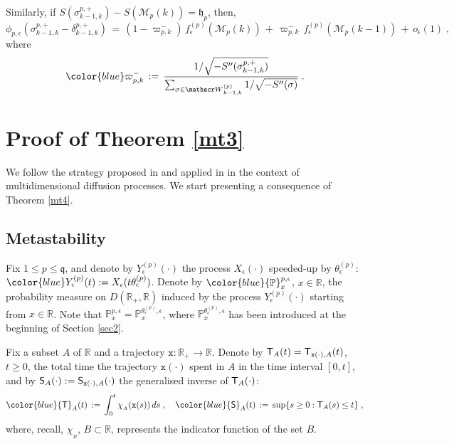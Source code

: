 \documentclass[reqno]{amsart}
\theoremstyle{plain}
\theoremstyle{definition}
\newcommand{\mf}[1]{{\mathfrak #1}}
\newcommand{\bb}[1]{{\mathbb #1}}
\newcommand{\ms}[1]{{\mathscr #1}}
\newcommand{\mss}[1]{{\textsf #1}}
\newcommand{\mtt}[1]{{\mathtt #1}}
\newcounter{as}[section]
\newcommand{\<}{\langle}
\renewcommand{\>}{\rangle}
\begin{document}
Similarly, if $S(\sigma^{p,+}_{k-1,k}) - S(\ms M_p(k)) = \mf
h_p$, then,
\begin{equation}
\label{67}
\phi_{p,\epsilon}(\sigma^{p,+}_{k-1,k} - \delta^{p,+}_{k-1,k}) \,=\,
(1-\varpi^{-}_{p,k})\, f^{(p)}_\epsilon(\ms M_p(k)) 
\,+\, \varpi^{-}_{p,k} \,  f^{(p)}_\epsilon(\ms M_p(k-1)) 
\,+\,o_\epsilon(1)\;,
\end{equation}
where
\begin{equation*}
{\color{blue} \varpi^{-}_{p,k} } \,: =\,
\frac{1/\sqrt{- S''(\sigma^{p,+}_{k-1,k})}}
{\sum_{\sigma \in \ms W^{(p)}_{k-1,k}} 1/\sqrt{- S''(\sigma)}}  \;.
\end{equation*}


\section{Proof of Theorem \ref{mt3}}
\label{sec8}

We follow the strategy proposed in \cite{llm} and applied in
\cite{lls1, lls2} in the context of multidimensional diffusion
processes.  We start presenting a consequence of Theorem \ref{mt4}.

\subsection*{Metastability}

Fix $1\le p\le \mf q$, and denote by $Y^{(p)}_\epsilon (\cdot)$ the
process $X_\epsilon(\cdot)$ speeded-up by $\theta^{(p)}_\epsilon$:
$\color{blue} Y^{(p)}_\epsilon (t) := X_\epsilon
(t\theta^{(p)}_\epsilon)$.  Denote by
$\color{blue} \bb P^{p, \epsilon} _{x}$, $x\in \bb R$, the probability
measure on $D(\bb R_{+}, \bb R)$ induced by the process
$Y^{(p)}_\epsilon (\cdot)$ starting from $x\in\bb R$.  Note that
$\bb P^{p, \epsilon} _{x} = \bb P^{\theta^{(p)}_\epsilon, \epsilon}
_{x}$, where $\bb P^{\theta^{(p)}_\epsilon, \epsilon} _{x}$ has been
introduced at the beginning of Section \ref{sec2}.

Fix a subset $A$ of $\bb R$ and a trajectory
$\mtt x\colon \bb R_+\to \bb R$.  Denote by
$\mss T_A(t) = \mss T_{\mtt x(\cdot), A}(t)$, $t\ge 0$, the total time
the trajectory $\mtt x (\cdot)$ spent in $A$ in the time interval
$[0,t]$, and by $\mss S_A (\cdot) := \mss S_{\mtt x(\cdot),A} (\cdot)$
the generalised inverse of $\mss T_A(\cdot)$:
\begin{equation*}
{\color{blue} \mss T_A(t)} \,:=\, \int_{0}^{t}
\chi_{_{A}}(\mtt x (s))\, ds \;, \quad
{\color{blue}\mss S_A(t)} \, := \,
\sup\{s\geq 0: \mss T_A(s)\leq t\}\;,
\end{equation*}
where, recall, $\chi_{_{B}}$, $B\subset \bb R$, represents the indicator
function of the set $B$.
\end{document}
